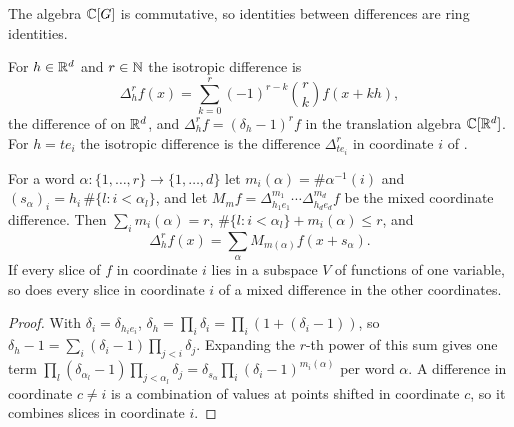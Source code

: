 The algebra $\mathbb{C}[G]$ is commutative, so identities between differences are ring identities.

\begin{definition}
\label{def:iso-diff}
\leanok
{}
For $h \in \mathbb{R}^d$ and $r \in \mathbb{N}$ the isotropic difference is
\[
  \Delta_h^r f(x) = \sum_{k=0}^r (-1)^{r-k} \binom{r}{k} f(x + kh) ,
\]
the difference of  on $\mathbb{R}^d$, and $\Delta_h^r f = (\delta_h - 1)^r f$ in the
translation algebra $\mathbb{C}[\mathbb{R}^d]$. For $h = t e_i$ the isotropic difference is the difference
$\Delta^r_{t e_i}$ in coordinate $i$ of .
\end{definition}

\begin{lemma}
\label{lem:iso-expansion}
\leanok
{}
For a word $\alpha \colon \{1, \dots, r\} \to \{1, \dots, d\}$ let $m_i(\alpha) = \#\alpha^{-1}(i)$
and $(s_\alpha)_i = h_i \, \#\{l : i < \alpha_l\}$, and let
$M_m f = \Delta^{m_1}_{h_1 e_1} \cdots \Delta^{m_d}_{h_d e_d} f$ be the mixed coordinate
difference. Then $\sum_i m_i(\alpha) = r$, $\#\{l : i < \alpha_l\} + m_i(\alpha) \leq r$, and
\[
  \Delta_h^r f(x) = \sum_{\alpha} M_{m(\alpha)} f(x + s_\alpha) .
\]
If every slice of $f$ in coordinate $i$ lies in a subspace $V$ of functions of one variable, so
does every slice in coordinate $i$ of a mixed difference in the other coordinates.
\end{lemma}

\begin{proof}
\leanok
With $\delta_i = \delta_{h_i e_i}$, $\delta_h = \prod_i \delta_i = \prod_i (1 + (\delta_i - 1))$, so
$\delta_h - 1 = \sum_i (\delta_i - 1) \prod_{j < i} \delta_j$. Expanding the $r$-th power of this
sum gives one term $\prod_l (\delta_{\alpha_l} - 1) \prod_{j < \alpha_l} \delta_j
= \delta_{s_\alpha} \prod_i (\delta_i - 1)^{m_i(\alpha)}$ per word $\alpha$. A difference in
coordinate $c \neq i$ is a combination of values at points shifted in coordinate $c$, so it
combines slices in coordinate $i$.
\end{proof}

